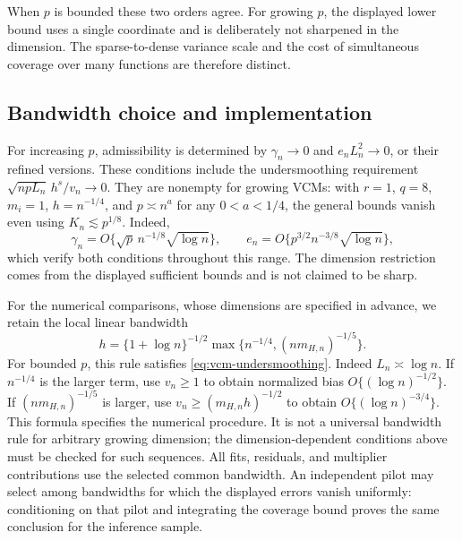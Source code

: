 \documentclass[12pt]{article}
\numberwithin{equation}{section}
\begin{document}
When $p$ is bounded these two orders agree. For growing $p$, the displayed lower bound uses a single coordinate and
is deliberately not sharpened in the dimension. The sparse-to-dense variance scale and the cost of simultaneous
coverage over many functions are therefore distinct.

\subsection{Bandwidth choice and implementation}\label{app:bandwidth-choices}
\label{app:implementation}

For increasing $p$, admissibility is determined by
$\gamma_n\to0$ and $e_nL_n^2\to0$, or their refined versions.
These conditions include the undersmoothing requirement
$\sqrt{npL_n}\,h^s/v_n\to0$.
They are nonempty for growing VCMs: with $r=1$, $q=8$, $m_i=1$,
$h=n^{-1/4}$, and $p\asymp n^a$ for any $0<a<1/4$, the general bounds
vanish even using $K_n\lesssim p^{1/8}$.
Indeed,
\[
\gamma_n=O\{\sqrt p\,n^{-1/8}\sqrt{\log n}\},\qquad
e_n=O\{p^{3/2}n^{-3/8}\sqrt{\log n}\},
\]
which verify both conditions throughout this range.
The dimension restriction comes from the displayed sufficient bounds and
is not claimed to be sharp.

For the numerical comparisons, whose dimensions are specified in advance,
we retain the local linear bandwidth
\begin{equation}
h=\{1+\log n\}^{-1/2}
\max\{n^{-1/4},(nm_{H,n})^{-1/5}\}.
\label{eq:local-linear-phase-bandwidth}
\end{equation}
For bounded $p$, this rule satisfies \eqref{eq:vcm-undersmoothing}.
Indeed $L_n\asymp\log n$. If $n^{-1/4}$ is the larger term, use
$v_n\ge1$ to obtain normalized bias $O\{(\log n)^{-1/2}\}$.
If $(nm_{H,n})^{-1/5}$ is larger, use
$v_n\ge(m_{H,n}h)^{-1/2}$ to obtain $O\{(\log n)^{-3/4}\}$.
This formula specifies the numerical procedure. It is not a universal
bandwidth rule for arbitrary growing dimension; the dimension-dependent
conditions above must be checked for such sequences.
All fits, residuals, and multiplier contributions use the selected common
bandwidth. An independent pilot may select among bandwidths for which the
displayed errors vanish uniformly: conditioning on that pilot and
integrating the coverage bound proves the same conclusion for the
inference sample.
\end{document}
